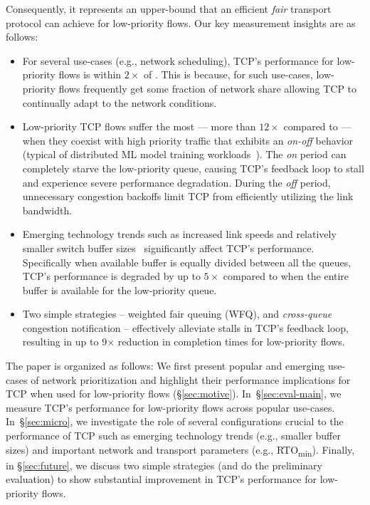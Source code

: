 Consequently, it represents an upper-bound that an efficient \emph{fair} transport protocol can achieve for low-priority flows. 
Our key measurement insights are as follows:
\begin{itemize}
    \item For several use-cases (e.g., network scheduling), TCP's performance for low-priority flows is within $2\times{}$ of \nearopt{}. This is because, for such use-cases, low-priority flows frequently get some fraction of network share allowing TCP to continually adapt to the network conditions.

    \item Low-priority TCP flows suffer the most --- more than $12\times{}$ compared to \nearopt{} --- when they coexist with high priority traffic that exhibits an \emph{on-off} behavior (typical of distributed ML model training workloads~\cite{p3,tiresias}). The \emph{on} period can completely starve the low-priority queue, causing TCP's feedback loop to stall and experience severe performance degradation. During the \emph{off} period, unnecessary congestion backoffs limit TCP from efficiently utilizing the link bandwidth. 

    \item Emerging technology trends such as increased link speeds and relatively smaller switch buffer sizes~\cite{one-more-config} significantly affect TCP's performance. Specifically when available buffer is equally divided between all the queues, TCP's performance is degraded by up to $5\times{}$ compared to when the entire buffer is available for the low-priority queue. 

    \item Two simple strategies -- weighted fair queuing (WFQ), and \emph{cross-queue} congestion notification -- effectively alleviate stalls in TCP's feedback loop, resulting in up to 9$\times$ reduction in completion times for low-priority flows.
        
\end{itemize}

The paper is organized as follows: We first present popular and emerging use-cases of network prioritization and highlight their performance implications for TCP when used for low-priority flows (\S\ref{sec:motive}). In~\S\ref{sec:eval-main}, we measure TCP's performance for low-priority flows across popular use-cases.
In~\S\ref{sec:micro}, we investigate the role of several configurations crucial to the performance of TCP such as emerging technology trends (e.g., smaller buffer sizes) and important network and transport parameters (e.g., RTO\textsubscript{min}).
Finally, in \S\ref{sec:future}, we discuss two simple strategies (and do the preliminary evaluation) to show substantial improvement in TCP's performance for low-priority flows.